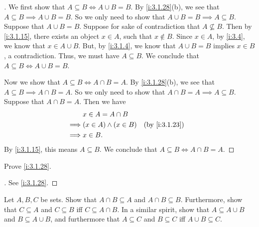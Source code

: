 \begin{proof}[]
  We first show that \(A \subseteq B \iff A \cup B = B\).
  By \cref{i:3.1.28}(b), we see that \(A \subseteq B \implies A \cup B = B\).
  So we only need to show that \(A \cup B = B \implies A \subseteq B\).
  Suppose that \(A \cup B = B\).
  Suppose for sake of contradiction that \(A \not\subseteq B\).
  Then by \cref{i:3.1.15}, there exists an object \(x \in A\), such that \(x \notin B\).
  Since \(x \in A\), by \cref{i:3.4}, we know that \(x \in A \cup B\).
  But, by \cref{i:3.1.4}, we know that \(A \cup B = B\) implies \(x \in B\), a contradiction.
  Thus, we must have \(A \subseteq B\).
  We conclude that \(A \subseteq B \iff A \cup B = B\).

  Now we show that \(A \subseteq B \iff A \cap B = A\).
  By \cref{i:3.1.28}(b), we see that \(A \subseteq B \implies A \cap B = A\).
  So we only need to show that \(A \cap B = A \implies A \subseteq B\).
  Suppose that \(A \cap B = A\).
  Then we have
  \begin{align*}
             & x \in A = A \cap B                           \\
    \implies & (x \in A) \land (x \in B) &  & \by{i:3.1.23} \\
    \implies & x \in B.
  \end{align*}
  By \cref{i:3.1.15}, this means \(A \subseteq B\).
  We conclude that \(A \subseteq B \iff A \cap B = A\).
\end{proof}

\begin{ex}\label{i:ex:3.1.6}
  Prove \cref{i:3.1.28}.
\end{ex}

\begin{proof}[]
  See \cref{i:3.1.28}.
\end{proof}

\begin{ex}\label{i:ex:3.1.7}
  Let \(A, B, C\) be sets.
  Show that \(A \cap B \subseteq A\) and \(A \cap B \subseteq B\).
  Furthermore, show that \(C \subseteq A\) and \(C \subseteq B\) iff \(C \subseteq A \cap B\).
  In a similar spirit, show that \(A \subseteq A \cup B\) and \(B \subseteq A \cup B\), and furthermore that \(A \subseteq C\) and \(B \subseteq C\) iff \(A \cup B \subseteq C\).
\end{ex}

